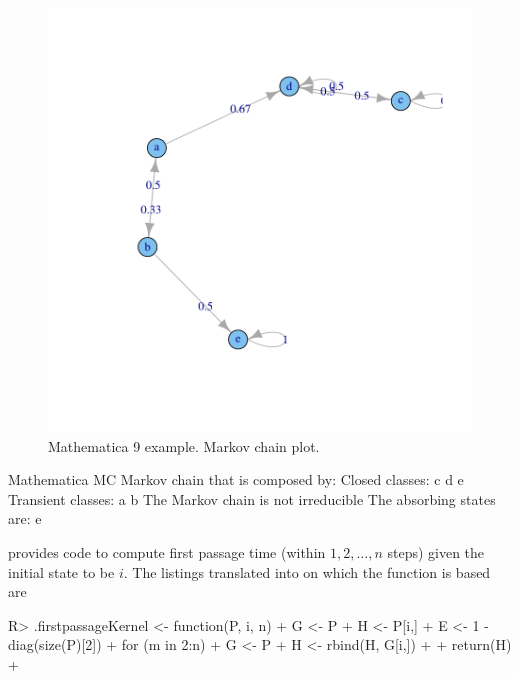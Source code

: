 \documentclass[nojss]{jss}
\begin{document}
\begin{figure}
\begin{center}
\includegraphics{an_introduction_to_markovchain_package-mathematica9McFig}
\caption{Mathematica 9 example. Markov chain plot.}
\label{fig:mcMathematics}
\end{center}
\end{figure}

\begin{Schunk}
\begin{Soutput}
Mathematica MC  Markov chain that is composed by: 
Closed classes: 
c d 
e 
Transient classes: 
a b 
The Markov chain is not irreducible 
The absorbing states are: e
\end{Soutput}
\end{Schunk}



\cite{renaldoMatlab} provides code to compute first passage time (within $1,2,\ldots, n$ steps) given the initial state to be $i$. The  listings translated into  on which the  function is based are

\begin{Schunk}
\begin{Sinput}
R> .firstpassageKernel <- function(P, i, n){
+    G <- P
+    H <- P[i,]
+    E <- 1 - diag(size(P)[2])
+    for (m in 2:n) {
+      G <- P %
+      H <- rbind(H, G[i,])
+    }
+    return(H)
+  }
\end{Sinput}
\end{Schunk}
\end{document}

